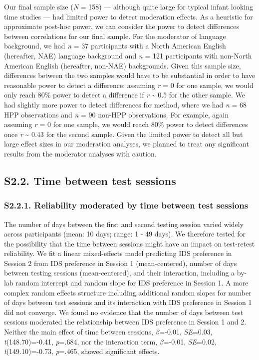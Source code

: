 \documentclass[
  english,
  man, donotrepeattitle,floatsintext]{apa6}
\begin{document}
Our final sample size (\emph{N} = 158) --- although quite large for typical infant looking time studies --- had limited power to detect moderation effects. As a heuristic for approximate post-hoc power, we can consider the power to detect differences between correlations for our final sample. For the moderator of language background, we had \emph{n} = 37 participants with a North American English (hereafter, NAE) language background and \emph{n} = 121 participants with non-North American English (hereafter, non-NAE) backgrounds. Given this sample size, differences between the two samples would have to be substantial in order to have reasonable power to detect a difference: assuming \emph{r} = 0 for one sample, we would only reach 80\% power to detect a difference if \emph{r} \textasciitilde{} 0.5 for the other sample. We had slightly more power to detect differences for method, where we had \emph{n} = 68 HPP observations and \emph{n} = 90 non-HPP observations. For example, again assuming \emph{r} = 0 for one sample, we would reach 80\% power to detect differences once \emph{r} \textasciitilde{} 0.43 for the second sample. Given the limited power to detect all but large effect sizes in our moderation analyses, we planned to treat any significant results from the moderator analyses with caution.

\hypertarget{s2.2.-time-between-test-sessions}{%
\subsection{S2.2. Time between test sessions}\label{s2.2.-time-between-test-sessions}}

\hypertarget{s2.2.1.-reliability-moderated-by-time-between-test-sessions}{%
\subsubsection{S2.2.1. Reliability moderated by time between test sessions}\label{s2.2.1.-reliability-moderated-by-time-between-test-sessions}}

The number of days between the first and second testing session varied widely across participants (mean: 10 days; range: 1 - 49 days). We therefore tested for the possibility that the time between sessions might have an impact on test-retest reliability. We fit a linear mixed-effects model predicting IDS preference in Session 2 from IDS preference in Session 1 (mean-centered), number of days between testing sessions (mean-centered), and their interaction, including a by-lab random intercept and random slope for IDS preference in Session 1.
A more complex random effects structure including additional random slopes for number of days between test sessions and its interaction with IDS preference in Session 1 did not converge.
We found no evidence that the number of days between test sessions moderated the relationship between IDS preference in Session 1 and 2. Neither the main effect of time between sessions, \(\beta\)=-0.01, \emph{SE}=0.03, \emph{t}(148.70)=-0.41, \emph{p}=.684, nor the interaction term, \(\beta\)=-0.01, \emph{SE}=0.02, \emph{t}(149.10)=-0.73, \emph{p}=.465, showed significant effects.
\end{document}
